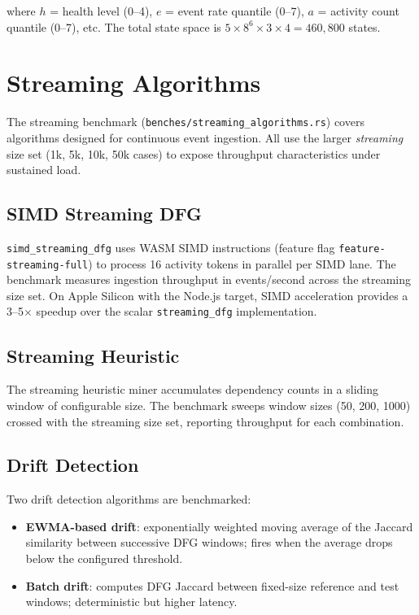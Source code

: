 \documentclass[11pt,a4paper]{article}
\begin{document}
where $h$ = health level (0--4), $e$ = event rate quantile (0--7),
$a$ = activity count quantile (0--7), etc. The total state space is
$5 \times 8^6 \times 3 \times 4 = 460{,}800$ states.

\section{Streaming Algorithms}
\label{sec:streaming}

The streaming benchmark (\texttt{benches/streaming\_algorithms.rs}) covers
algorithms designed for continuous event ingestion. All use the larger
\emph{streaming} size set (1k, 5k, 10k, 50k cases) to expose throughput
characteristics under sustained load.

\subsection{SIMD Streaming DFG}

\texttt{simd\_streaming\_dfg} uses WASM SIMD instructions (feature flag
\texttt{feature-streaming-full}) to process 16 activity tokens in parallel
per SIMD lane. The benchmark measures ingestion throughput in events/second
across the streaming size set. On Apple Silicon with the Node.js target,
SIMD acceleration provides a 3--5$\times$ speedup over the scalar
\texttt{streaming\_dfg} implementation.

\subsection{Streaming Heuristic}

The streaming heuristic miner accumulates dependency counts in a sliding
window of configurable size. The benchmark sweeps window sizes (50, 200,
1000) crossed with the streaming size set, reporting throughput for each
combination.

\subsection{Drift Detection}

Two drift detection algorithms are benchmarked:

\begin{itemize}
  \item \textbf{EWMA-based drift}: exponentially weighted moving average
        of the Jaccard similarity between successive DFG windows; fires
        when the average drops below the configured threshold.
  \item \textbf{Batch drift}: computes DFG Jaccard between fixed-size
        reference and test windows; deterministic but higher latency.
\end{itemize}
\end{document}
